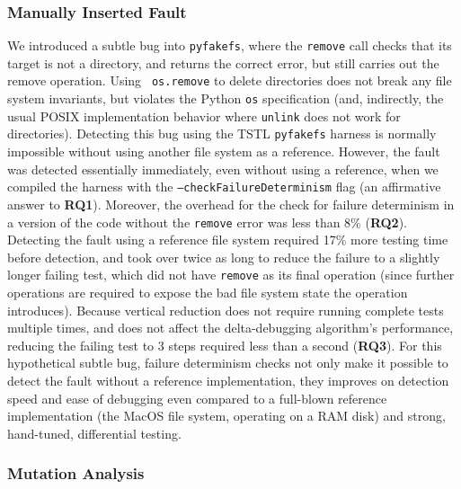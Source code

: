 \subsubsection{Manually Inserted Fault}

We introduced a subtle bug into {\tt pyfakefs}, where the {\tt remove}
call checks that its target is not a directory, and returns the
correct error, but still carries out the remove operation.  Using {\tt
  os.remove} to delete directories does not break any file system
invariants, but violates the Python {\tt os} specification (and,
indirectly, the usual POSIX implementation behavior where {\tt unlink}
does not work for directories).  Detecting this bug using the TSTL
{\tt pyfakefs} harness is normally impossible without using another
file system as a reference.  However, the fault was detected  essentially
immediately, even without using a reference, when we compiled the harness
with the {\tt --checkFailureDeterminism} flag (an affirmative answer
to {\bf RQ1}).  Moreover, the overhead for the check for failure determinism in a
version of the code without the {\tt remove} error was
less than 8\%  ({\bf RQ2}).  Detecting the fault using a reference file system 
required 17\% more testing time before detection, and took over twice as
long to reduce the failure to a
slightly longer failing test, which did not have {\tt remove} as its
final operation (since further operations are required to 
expose the bad file system state the operation introduces).
Because vertical
reduction does not require running complete tests multiple times, and
does not affect the delta-debugging algorithm's performance, reducing
the failing test to 3 steps required less than a second ({\bf RQ3}).
For this hypothetical subtle bug, failure determinism checks not only make it
possible to detect the fault without a reference implementation, they
improves on detection speed and ease of debugging even compared to a
full-blown reference implementation (the MacOS file system, operating
on a RAM disk) and strong, hand-tuned, differential testing.

\subsubsection{Mutation Analysis}

